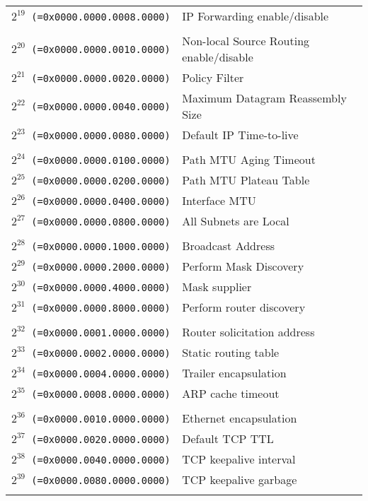 \documentclass[documentation]{subfiles}
\begin{document}
\begin{small}
\begin{longtable}{>{\tt}rl}
        $2^{19}$ (=0x0000.0000.0008.0000) & IP Forwarding enable/disable \\
        \\
        $2^{20}$ (=0x0000.0000.0010.0000) & Non-local Source Routing enable/disable \\
        $2^{21}$ (=0x0000.0000.0020.0000) & Policy Filter \\
        $2^{22}$ (=0x0000.0000.0040.0000) & Maximum Datagram Reassembly Size \\
        $2^{23}$ (=0x0000.0000.0080.0000) & Default IP Time-to-live \\
        \\
        $2^{24}$ (=0x0000.0000.0100.0000) & Path MTU Aging Timeout \\
        $2^{25}$ (=0x0000.0000.0200.0000) & Path MTU Plateau Table \\
        $2^{26}$ (=0x0000.0000.0400.0000) & Interface MTU \\
        $2^{27}$ (=0x0000.0000.0800.0000) & All Subnets are Local \\
        \\
        $2^{28}$ (=0x0000.0000.1000.0000) & Broadcast Address \\
        $2^{29}$ (=0x0000.0000.2000.0000) & Perform Mask Discovery \\
        $2^{30}$ (=0x0000.0000.4000.0000) & Mask supplier \\
        $2^{31}$ (=0x0000.0000.8000.0000) & Perform router discovery \\
        \\
        $2^{32}$ (=0x0000.0001.0000.0000) & Router solicitation address \\
        $2^{33}$ (=0x0000.0002.0000.0000) & Static routing table \\
        $2^{34}$ (=0x0000.0004.0000.0000) & Trailer encapsulation \\
        $2^{35}$ (=0x0000.0008.0000.0000) & ARP cache timeout \\
        \\
        $2^{36}$ (=0x0000.0010.0000.0000) & Ethernet encapsulation \\
        $2^{37}$ (=0x0000.0020.0000.0000) & Default TCP TTL \\
        $2^{38}$ (=0x0000.0040.0000.0000) & TCP keepalive interval \\
        $2^{39}$ (=0x0000.0080.0000.0000) & TCP keepalive garbage \\
        \\

\end{longtable}
\end{small}
\end{document}
